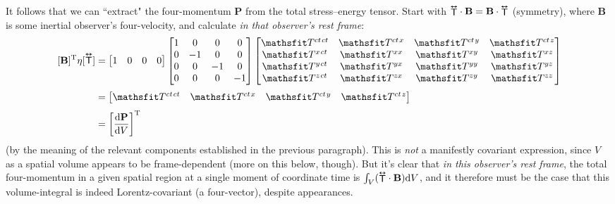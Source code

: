 \documentclass[12pt]{article}
\renewcommand{\vv}[1]{\mathbf{#1}}
\newcommand{\dd}[1]{\mathrm{d}#1}
\newcommand{\tightoverset}[2]{%
  \mathop{#2}\limits^{\vbox to -.5ex{\kern-0.75ex\hbox{$#1$}\vss}}}
\newcommand{\inlinedy}[1]{\tightoverset{\text{\tiny$\bm\leftrightarrow$}}{#1}}
\newcommand{\capdy}[1]{ \overset{ \text{\tiny$\bm\leftrightarrow$} }{\vphantom{\text{\small{A}}}\smash{#1}} }
\begin{document}
It follows that we can ``extract" the four-momentum $\vv P$ from the total stress--energy tensor. Start with ${\inlinedy{\mathsf{T}}} \cdot \vv B = \vv B \cdot {\inlinedy{\mathsf{T}}}$ (symmetry), where $\vv B$ is some inertial observer's four-velocity, and calculate \emph{in that observer's rest frame}:
\begin{equation*}
\begin{aligned}
\, [ \vv B ]^{\mathrm{T}} \eta [ \capdy{\mathsf{T}}  ]
&=
\begin{bmatrix}
1 & 0 & 0 & 0
\end{bmatrix}
\begin{bmatrix}
1 & 0 & 0 & 0 \\
0 & -1 & 0 & 0 \\
0 & 0 & -1 & 0 \\
0 & 0 & 0 & -1
\end{bmatrix}
\begin{bmatrix}
\mathsfit T^{ct \mkern1.5mu ct} & \mathsfit T^{ct \mkern1.5mu x} & \mathsfit T^{ct \mkern1.5mu y} & \mathsfit T^{ct \mkern1.5mu z} \\
\mathsfit T^{x \mkern1.5mu ct} & \mathsfit T^{x x} & \mathsfit T^{x y} & \mathsfit T^{x z}  \\
\mathsfit T^{y \mkern1.5mu ct} & \mathsfit T^{y x} & \mathsfit T^{y y} & \mathsfit T^{y z}  \\
\mathsfit T^{z \mkern1.5mu ct} & \mathsfit T^{z x} & \mathsfit T^{z y} & \mathsfit T^{z z} 
\end{bmatrix}
\\[3pt]
&=
\begin{bmatrix}
\mathsfit T^{ct \mkern1.5mu ct} & \mathsfit T^{ct \mkern1.5mu x} & \mathsfit T^{ct \mkern1.5mu y} & \mathsfit T^{ct \mkern1.5mu z}
\end{bmatrix}
\\[3pt]
&=
\left[ \dfrac{\dd \vv P}{\dd V} \right]^{\mathrm{T}}
\end{aligned}
\end{equation*}
(by the meaning of the relevant components established in the previous paragraph). This is \emph{not} a manifestly covariant expression, since $V$ as a spatial volume appears to be frame-dependent (more on this below, though). But it's clear that \emph{in this observer's rest frame}, the total four-momentum in a given spatial region at a single moment of coordinate time is $\int_V ({\inlinedy{\mathsf{T}}} \cdot \vv B) \dd V$, and it therefore must be the case that this volume-integral is indeed Lorentz-covariant (a four-vector), despite appearances.
\end{document}
